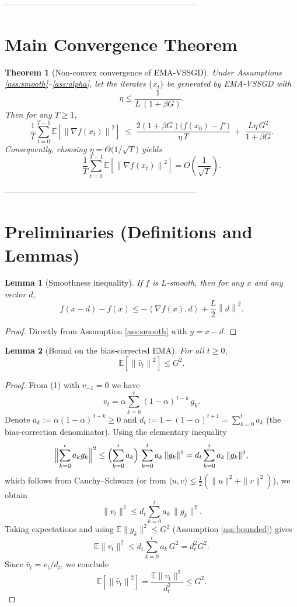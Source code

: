 \documentclass{article}
\newcommand{\E}{\mathbb{E}}
\newcommand{\norm}[1]{\left\|#1\right\|}
\newcommand{\ip}[2]{\left\langle #1,#2\right\rangle}
\newcommand{\grad}{\nabla}
\newtheorem{theorem}{Theorem}
\newtheorem{lemma}{Lemma}
\begin{document}
-----------------------------------------------------------------------

\section*{Main Convergence Theorem}
\begin{theorem}[Non‑convex convergence of EMA‑VSSGD]\label{thm:main}
Under Assumptions \ref{ass:smooth}–\ref{ass:alpha}, let the iterates $\{x_{t}\}$ be generated by EMA‑VSSGD with
\[
\eta\le\frac{1}{L\,(1+\beta G)} .
\]
Then for any $T\ge1$,
\[
\frac{1}{T}\sum_{t=0}^{T-1}\E\!\left[\norm{\grad f(x_{t})}^{2}\right]
\;\le\;
\frac{2(1+\beta G)\bigl(f(x_{0})-f^{\star}\bigr)}{\eta\,T}
\;+\;
\frac{L\eta\,G^{2}}{1+\beta G}.
\tag{5}
\]
Consequently, choosing $\displaystyle\eta = \Theta\!\bigl(1/\sqrt{T}\bigr)$ yields
\[
\frac{1}{T}\sum_{t=0}^{T-1}\E\!\left[\norm{\grad f(x_{t})}^{2}\right]
= O\!\left(\frac{1}{\sqrt{T}}\right).
\]
\end{theorem}

-----------------------------------------------------------------------

\section*{Preliminaries (Definitions and Lemmas)}
\begin{lemma}[Smoothness inequality]\label{lem:smooth}
If $f$ is $L$‑smooth, then for any $x$ and any vector $d$,
\[
f(x-d)-f(x)\le -\ip{\grad f(x)}{d}+\frac{L}{2}\norm{d}^{2}.
\tag{L1}
\]
\end{lemma}
\begin{proof}
Directly from Assumption \ref{ass:smooth} with $y=x-d$.
\end{proof}

\begin{lemma}[Bound on the bias‑corrected EMA]\label{lem:ema}
For all $t\ge0$,
\[
\E\!\left[\norm{\hat v_{t}}^{2}\right]\le G^{2}.
\tag{L2}
\]
\end{lemma}
\begin{proof}
From (1) with $v_{-1}=0$ we have
\[
v_{t}= \alpha\sum_{k=0}^{t}(1-\alpha)^{\,t-k}\,g_{k}.
\]
Denote $a_{k}:=\alpha(1-\alpha)^{\,t-k}\ge0$ and $d_{t}:=1-(1-\alpha)^{t+1}=\sum_{k=0}^{t}a_{k}$ (the bias‑correction denominator).  
Using the elementary inequality
\[
\Bigl\|\sum_{k=0}^{t}a_{k}g_{k}\Bigr\|^{2}
\le \Bigl(\sum_{k=0}^{t}a_{k}\Bigr)\,
      \sum_{k=0}^{t}a_{k}\,\|g_{k}\|^{2}
      = d_{t}\sum_{k=0}^{t}a_{k}\,\|g_{k}\|^{2},
\]
which follows from Cauchy–Schwarz (or from $\langle u,v\rangle\le\frac{1}{2}(\|u\|^{2}+\|v\|^{2})$), we obtain
\[
\|v_{t}\|^{2}\le d_{t}\sum_{k=0}^{t}a_{k}\,\|g_{k}\|^{2}.
\]
Taking expectations and using $\E\|g_{k}\|^{2}\le G^{2}$ (Assumption \ref{ass:bounded}) gives
\[
\E\|v_{t}\|^{2}\le d_{t}\sum_{k=0}^{t}a_{k}\,G^{2}
               = d_{t}^{2}G^{2}.
\]
Since $\hat v_{t}=v_{t}/d_{t}$, we conclude
\[
\E\!\left[\norm{\hat v_{t}}^{2}\right]=\frac{\E\|v_{t}\|^{2}}{d_{t}^{2}}\le G^{2}.
\]
\end{proof}
\end{document}
